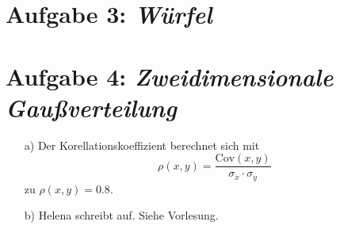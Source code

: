 \section*{Aufgabe 3: \emph{Würfel}}


\section*{Aufgabe 4: \emph{Zweidimensionale Gaußverteilung}}

\begin{itemize}
\item[a)] Der Korellationskoeffizient berechnet sich mit
\begin{equation}
\rho(x,y)=\frac{\text{Cov}(x,y)}{\sigma_x\cdot\sigma_y}
\end{equation}
zu $\rho(x,y)=0.8.$

\item[b)] Helena schreibt auf. Siehe Vorlesung.


\end{itemize}
